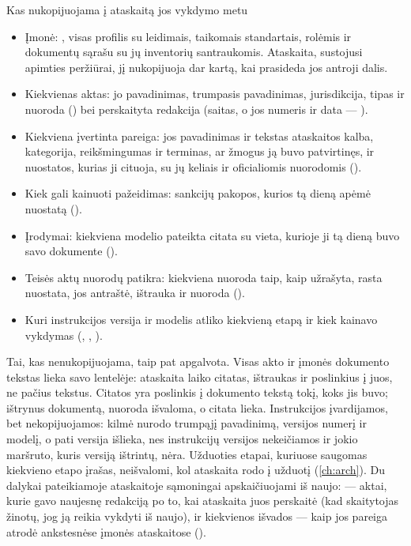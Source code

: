 \begin{codebox}{Kas nukopijuojama į ataskaitą jos vykdymo metu}
\begin{itemize}
  \item Įmonė: , visas profilis su leidimais, taikomais
    standartais, rolėmis ir dokumentų sąrašu su jų inventorių santraukomis. Ataskaita, sustojusi
    apimties peržiūrai, jį nukopijuoja dar kartą, kai prasideda jos antroji dalis.
  \item Kiekvienas aktas: jo pavadinimas, trumpasis pavadinimas, jurisdikcija, tipas ir
    nuoroda () bei perskaityta redakcija (saitas, o jos numeris ir data ---
    ).
  \item Kiekviena įvertinta pareiga: jos pavadinimas ir tekstas ataskaitos kalba, kategorija,
    reikšmingumas ir terminas, ar žmogus ją buvo patvirtinęs, ir nuostatos, kurias ji cituoja,
    su jų keliais ir oficialiomis nuorodomis ().
  \item Kiek gali kainuoti pažeidimas: sankcijų pakopos, kurios tą dieną apėmė nuostatą
    ().
  \item Įrodymai: kiekviena modelio pateikta citata su vieta, kurioje ji tą dieną buvo savo
    dokumente ().
  \item Teisės aktų nuorodų patikra: kiekviena nuoroda taip, kaip užrašyta, rasta nuostata,
    jos antraštė, ištrauka ir nuoroda ().
  \item Kuri instrukcijos versija ir modelis atliko kiekvieną etapą ir kiek kainavo vykdymas
    (, , ).
\end{itemize}
\end{codebox}

Tai, kas nenukopijuojama, taip pat apgalvota. Visas akto ir įmonės dokumento tekstas lieka
savo lentelėje: ataskaita laiko citatas, ištraukas ir poslinkius į juos, ne pačius tekstus.
Citatos  yra poslinkis į dokumento tekstą tokį, koks jis buvo; ištrynus dokumentą,
nuoroda išvaloma, o citata lieka. Instrukcijos įvardijamos, bet nekopijuojamos: kilmė nurodo
trumpąjį pavadinimą, versijos numerį ir modelį, o pati versija išlieka, nes instrukcijų
versijos nekeičiamos ir jokio maršruto, kuris versiją ištrintų, nėra. Užduoties etapai, kuriuose saugomas kiekvieno etapo įrašas, neišvalomi, kol ataskaita
rodo į užduotį (\cref{ch:arch}). Du dalykai pateikiamoje ataskaitoje sąmoningai
apskaičiuojami iš naujo:  --- aktai, kurie gavo naujesnę redakciją po to,
kai ataskaita juos perskaitė (kad skaitytojas žinotų, jog ją reikia vykdyti iš naujo), ir
kiekvienos išvados  --- kaip jos pareiga atrodė ankstesnėse įmonės ataskaitose
().

